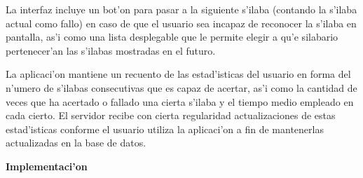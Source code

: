 La interfaz incluye un bot'on para pasar a la siguiente s'ilaba (contando la s'ilaba actual como fallo) en caso de 
que el usuario sea incapaz de reconocer la s'ilaba en pantalla, as'i como una lista desplegable que le permite elegir
a qu'e silabario pertenecer'an las s'ilabas mostradas en el futuro.

La aplicaci'on mantiene un recuento de las estad'isticas del usuario en forma del n'umero de s'ilabas consecutivas
que es capaz de acertar, as'i como la cantidad de veces que ha acertado  o fallado una cierta s'ilaba y el tiempo
medio empleado en cada cierto. El servidor recibe con cierta regularidad actualizaciones de estas estad'isticas
conforme el usuario utiliza la aplicaci'on a fin de mantenerlas actualizadas en la base de datos.

\textbf{Implementaci'on}

